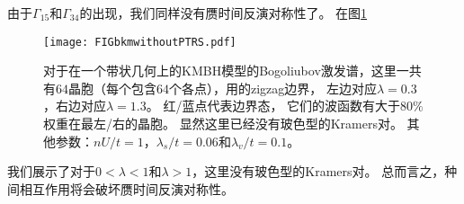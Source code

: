 由于$\Gamma_{15}$和$\Gamma_{34}$的出现，我们同样没有赝时间反演对称性了。
在图\ref{KMBHwithoutPTRS}%
\begin{figure}
	\texttt{[image: FIGbkmwithoutPTRS.pdf]}
	\caption{\label{KMBHwithoutPTRS}对于在一个带状几何上的KMBH模型的Bogoliubov激发谱，这里一共有$64$晶胞（每个包含$64$个各点），用的zigzag边界，
	左边对应$\lambda=0.3$，右边对应$\lambda=1.3$。
	红/蓝点代表边界态，
	它们的波函数有大于$80\%$权重在最左/右的晶胞。
	显然这里已经没有玻色型的Kramers对。
	其他参数：$nU/t=1$，$\lambda_s/t=0.06$和$\lambda_v/t=0.1$。}
\end{figure}
我们展示了对于$0<\lambda<1$和$\lambda>1$，这里没有玻色型的Kramers对。
总而言之，种间相互作用将会破坏赝时间反演对称性。







